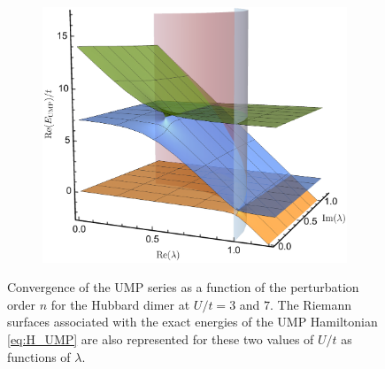 \documentclass[aps,prb,reprint,noshowkeys,superscriptaddress]{revtex4-1}
\begin{document}
\begin{figure}
\begin{subfigure}{0.32\textwidth}
	\includegraphics[height=0.75\textwidth]{fig3c}	
    \end{subfigure}	\caption{
	Convergence of the UMP series as a function of the perturbation order $n$ for the Hubbard dimer at $U/t = 3$ and $7$.
	The Riemann surfaces associated with the exact energies of the UMP Hamiltonian \eqref{eq:H_UMP} are also represented for these two values of $U/t$ as functions of $\lambda$.
	\label{fig:UMP}}
\end{figure}
\end{document}
